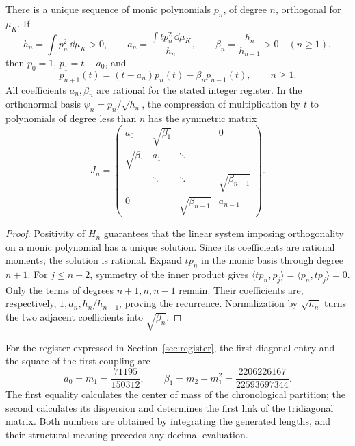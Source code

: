 \begin{theorem}
\label{thm:jacobi-recurrence}
There is a unique sequence of monic polynomials \(p_n\), of degree
\(n\), orthogonal for \(\mu_K\). If
\[
 h_n=\int p_n^2\,\dd\mu_K>0,\qquad
 a_n=\frac{\int t p_n^2\,\dd\mu_K}{h_n},\qquad
 \beta_n=\frac{h_n}{h_{n-1}}>0\quad(n\geq1),
\]
then \(p_0=1\), \(p_1=t-a_0\), and
\begin{equation}
 p_{n+1}(t)=(t-a_n)p_n(t)-\beta_np_{n-1}(t),\qquad n\geq1.
 \label{eq:jacobi-recurrence}
\end{equation}
All coefficients \(a_n,\beta_n\) are rational for the stated integer
register. In the orthonormal basis \(\psi_n=p_n/\sqrt{h_n}\),
the compression of multiplication by \(t\) to polynomials of degree
less than \(n\) has the symmetric matrix
\[
 J_n=\begin{pmatrix}
 a_0&\sqrt{\beta_1}&&0\\
 \sqrt{\beta_1}&a_1&\ddots&\\
 &\ddots&\ddots&\sqrt{\beta_{n-1}}\\
 0&&\sqrt{\beta_{n-1}}&a_{n-1}
 \end{pmatrix}.
\]
\end{theorem}
\begin{proof}
Positivity of \(H_n\) guarantees that the linear system imposing
orthogonality on a monic polynomial has a unique solution. Since its
coefficients are rational moments, the solution is rational. Expand
\(tp_n\) in the monic basis through degree \(n+1\). For
\(j\leq n-2\), symmetry of the inner product gives
\(\langle tp_n,p_j\rangle=\langle p_n,tp_j\rangle=0\).
Only the terms of degrees \(n+1,n,n-1\) remain. Their coefficients
are, respectively, \(1,a_n,h_n/h_{n-1}\), proving the recurrence.
Normalization by \(\sqrt{h_n}\) turns the two adjacent coefficients
into \(\sqrt{\beta_n}\).
\end{proof}

For the register expressed in Section~\ref{sec:register}, the first
diagonal entry and the square of the first coupling are
\[
 a_0=m_1=\frac{71195}{150312},\qquad
 \beta_1=m_2-m_1^2=\frac{2206226167}{22593697344}.
\]
The first equality calculates the center of mass of the chronological
partition; the second calculates its dispersion and determines the
first link of the tridiagonal matrix. Both numbers are obtained by
integrating the generated lengths, and their structural meaning
precedes any decimal evaluation.


